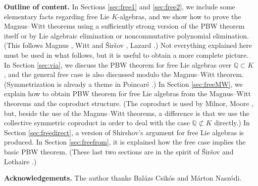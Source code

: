 \documentclass[11pt,a4paper]{amsart}
\newcommand{\snewpage}{}
\newcommand{\snewpage}{\newpage}
\newcommand{\snewpage}{}
\theoremstyle{definition}
\theoremstyle{plain}
\begin{document}
\snewpage

\textbf{Outline of content.}
In Sections \ref{sec:free1} and \ref{sec:free2}, we include some elementary facts regarding free Lie $K$-algebras,
 and we show how to prove the Magnus--Witt theorems  using a sufficiently strong version of the PBW theorem itself
 or by Lie algebraic elimination or noncommutative polynomial elimination.
(This follows  Magnus \cite{MM}, Witt \cite{W} and \v{S}ir\v{s}ov \cite{S0}, Lazard \cite{L2}.)
Not everything explained here must be used in what follows, but it is useful to obtain a more complete picture.
In Section \ref{sec:via}, we discuss the PBW theorem for free Lie algebras over $\mathbb Q\subset K$,
 and the general free case is also discussed modulo the Magnus--Witt theorem.
(Symmetrization is already a theme in Poincaré \cite{P}.)
In Section \ref{sec:freeMW}, we explain how to obtain PBW theorem for free Lie algebras
 from the Magnus--Witt theorems and the coproduct structure.
(The coproduct is used by  Milnor, Moore \cite{MiMo}, but, beside the use of the Magnus--Witt theorems,
 a  difference is that we use the  collective symmetric coproduct in order to deal with the case $\mathbb Q\not\subset K$  directly.)
In Section \ref{sec:freedirect}, a version of Shirshov's argument for free Lie algebras  is produced.
In Section \ref{sec:freefrom}, it is explained how the free case implies the basic PBW theorem.
(These last two sections are   in the spirit of \v{S}ir\v{s}ov \cite{S2} and Lothaire \cite{Lot}.)



\textbf{Acknowledgements.}
 The author thanks Bal\'azs Csik\'os and Márton Naszódi.

\snewpage
\end{document}
